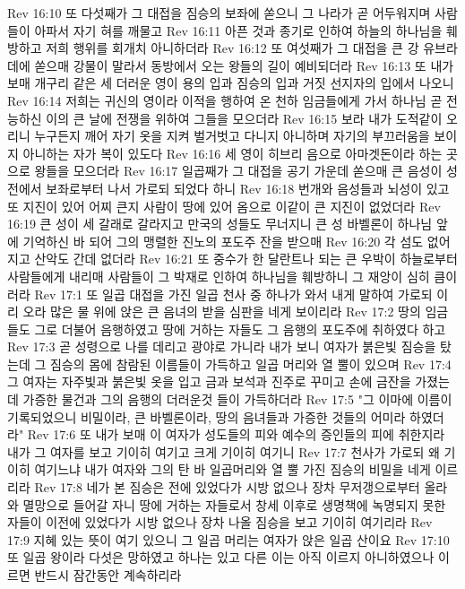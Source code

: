 Rev 16:10  또 다섯째가 그 대접을 짐승의 보좌에 쏟으니 그 나라가 곧 어두워지며 사람들이 아파서 자기 혀를 깨물고
Rev 16:11  아픈 것과 종기로 인하여 하늘의 하나님을 훼방하고 저희 행위를 회개치 아니하더라
Rev 16:12  또 여섯째가 그 대접을 큰 강 유브라데에 쏟으매 강물이 말라서 동방에서 오는 왕들의 길이 예비되더라
Rev 16:13  또 내가 보매 개구리 같은 세 더러운 영이 용의 입과 짐승의 입과 거짓 선지자의 입에서 나오니
Rev 16:14  저희는 귀신의 영이라 이적을 행하여 온 천하 임금들에게 가서 하나님 곧 전능하신 이의 큰 날에 전쟁을 위하여 그들을 모으더라
Rev 16:15  보라 내가 도적같이 오리니 누구든지 깨어 자기 옷을 지켜 벌거벗고 다니지 아니하며 자기의 부끄러움을 보이지 아니하는 자가 복이 있도다
Rev 16:16  세 영이 히브리 음으로 아마겟돈이라 하는 곳으로 왕들을 모으더라
Rev 16:17  일곱째가 그 대접을 공기 가운데 쏟으매 큰 음성이 성전에서 보좌로부터 나서 가로되 되었다 하니
Rev 16:18  번개와 음성들과 뇌성이 있고 또 지진이 있어 어찌 큰지 사람이 땅에 있어 옴으로 이같이 큰 지진이 없었더라
Rev 16:19  큰 성이 세 갈래로 갈라지고 만국의 성들도 무너지니 큰 성 바벨론이 하나님 앞에 기억하신 바 되어 그의 맹렬한 진노의 포도주 잔을 받으매
Rev 16:20  각 섬도 없어지고 산악도 간데 없더라
Rev 16:21  또 중수가 한 달란트나 되는 큰 우박이 하늘로부터 사람들에게 내리매 사람들이 그 박재로 인하여 하나님을 훼방하니 그 재앙이 심히 큼이러라
Rev 17:1  또 일곱 대접을 가진 일곱 천사 중 하나가 와서 내게 말하여 가로되 이리 오라 많은 물 위에 앉은 큰 음녀의 받을 심판을 네게 보이리라
Rev 17:2  땅의 임금들도 그로 더불어 음행하였고 땅에 거하는 자들도 그 음행의 포도주에 취하였다 하고
Rev 17:3  곧 성령으로 나를 데리고 광야로 가니라 내가 보니 여자가 붉은빛 짐승을 탔는데 그 짐승의 몸에 참람된 이름들이 가득하고 일곱 머리와 열 뿔이 있으며
Rev 17:4  그 여자는 자주빛과 붉은빛 옷을 입고 금과 보석과 진주로 꾸미고 손에 금잔을 가졌는데 가증한 물건과 그의 음행의 더러운것 들이 가득하더라
Rev 17:5  "그 이마에 이름이 기록되었으니 비밀이라, 큰 바벨론이라, 땅의 음녀들과 가증한 것들의 어미라 하였더라"
Rev 17:6  또 내가 보매 이 여자가 성도들의 피와 예수의 증인들의 피에 취한지라 내가 그 여자를 보고 기이히 여기고 크게 기이히 여기니
Rev 17:7  천사가 가로되 왜 기이히 여기느냐 내가 여자와 그의 탄 바 일곱머리와 열 뿔 가진 짐승의 비밀을 네게 이르리라
Rev 17:8  네가 본 짐승은 전에 있었다가 시방 없으나 장차 무저갱으로부터 올라와 멸망으로 들어갈 자니 땅에 거하는 자들로서 창세 이후로 생명책에 녹명되지 못한 자들이 이전에 있었다가 시방 없으나 장차 나올 짐승을 보고 기이히 여기리라
Rev 17:9  지혜 있는 뜻이 여기 있으니 그 일곱 머리는 여자가 앉은 일곱 산이요
Rev 17:10  또 일곱 왕이라 다섯은 망하였고 하나는 있고 다른 이는 아직 이르지 아니하였으나 이르면 반드시 잠간동안 계속하리라
